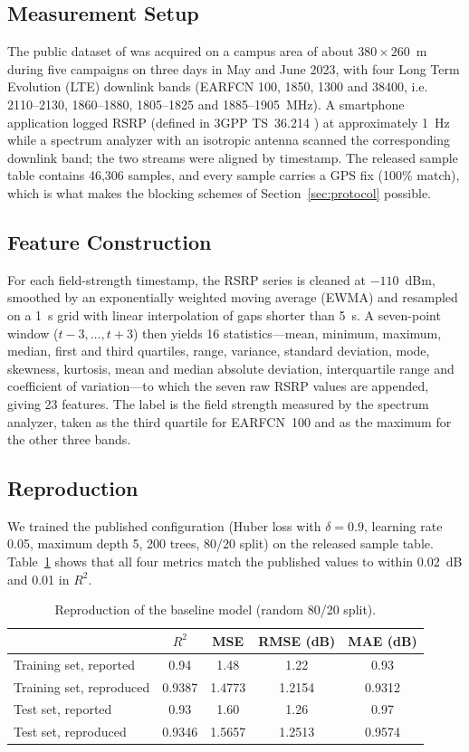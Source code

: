 \documentclass{ieeeaccess}
\begin{document}
\subsection{Measurement Setup}
The public dataset of \cite{zeng2024} was acquired on a campus area of about
$380\times260$~m during five campaigns on three days in May and June 2023, with
four Long Term Evolution (LTE) downlink bands (EARFCN 100, 1850, 1300 and 38400, i.e. 2110--2130,
1860--1880, 1805--1825 and 1885--1905~MHz). A smartphone application logged RSRP
(defined in 3GPP TS~36.214 \cite{3gpp}) at approximately 1~Hz while a spectrum analyzer with an isotropic antenna scanned
the corresponding downlink band; the two streams were aligned by timestamp. The
released sample table contains 46{,}306 samples, and every sample carries a GPS
fix (100\% match), which is what makes the blocking schemes of
Section~\ref{sec:protocol} possible.

\subsection{Feature Construction}
For each field-strength timestamp, the RSRP series is cleaned at $-110$~dBm,
smoothed by an exponentially weighted moving average (EWMA) and resampled on a 1~s
grid with linear interpolation of gaps shorter than 5~s. A seven-point window
($t-3,\ldots,t+3$) then yields 16 statistics---mean, minimum, maximum, median,
first and third quartiles, range, variance, standard deviation, mode, skewness,
kurtosis, mean and median absolute deviation, interquartile range and coefficient
of variation---to which the seven raw RSRP values are appended, giving 23
features. The label is the field strength measured by the spectrum analyzer, taken
as the third quartile for EARFCN~100 and as the maximum for the other three bands.

\subsection{Reproduction}
We trained the published configuration (Huber loss with $\delta=0.9$, learning
rate 0.05, maximum depth 5, 200 trees, 80/20 split) on the released sample table.
Table~\ref{tab:repro} shows that all four metrics match the published values to
within 0.02~dB and 0.01 in $R^2$.

\begin{table}
\caption{Reproduction of the baseline model (random 80/20 split).}
\label{tab:repro}
\setlength{\tabcolsep}{3pt}
\begin{tabular}{|l|c|c|c|c|}
\hline
 & $R^2$ & MSE & RMSE (dB) & MAE (dB)\\
\hline
Training set, reported \cite{zeng2024} & 0.94 & 1.48 & 1.22 & 0.93\\
Training set, reproduced & 0.9387 & 1.4773 & 1.2154 & 0.9312\\
Test set, reported \cite{zeng2024} & 0.93 & 1.60 & 1.26 & 0.97\\
Test set, reproduced & 0.9346 & 1.5657 & 1.2513 & 0.9574\\
\hline
\end{tabular}
\end{table}
\end{document}
